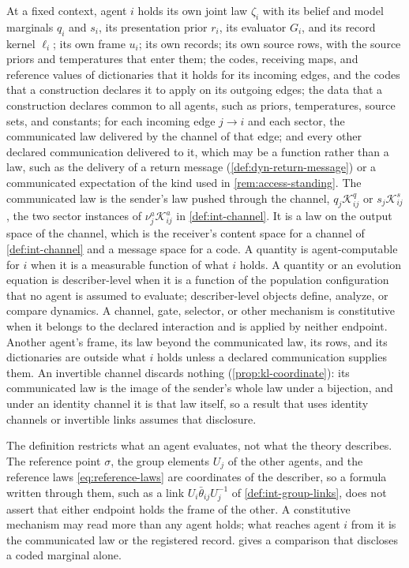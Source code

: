 At a fixed context, agent $i$ holds its own joint law $\zeta_i$ with its belief and model marginals $q_i$ and $s_i$, its presentation prior $r_i$, its evaluator $G_i$, and its record kernel $\ell_i$; its own frame $u_i$; its own records; its own source rows, with the source priors and temperatures that enter them; the codes, receiving maps, and reference values of dictionaries that it holds for its incoming edges, and the codes that a construction declares it to apply on its outgoing edges; the data that a construction declares common to all agents, such as priors, temperatures, source sets, and constants; for each incoming edge $j\to i$ and each sector, the communicated law delivered by the channel of that edge; and every other declared communication delivered to it, which may be a function rather than a law, such as the delivery of a return message (\cref{def:dyn-return-message}) or a communicated expectation of the kind used in \cref{rem:access-standing}. The communicated law is the sender's law pushed through the channel, $q_j\mathcal K^q_{ij}$ or $s_j\mathcal K^s_{ij}$, the two sector instances of $\nu_j^a\mathcal K_{ij}^a$ in \cref{def:int-channel}. It is a law on the output space of the channel, which is the receiver's content space for a channel of \cref{def:int-channel} and a message space for a code. A quantity is agent-computable for $i$ when it is a measurable function of what $i$ holds. A quantity or an evolution equation is describer-level when it is a function of the population configuration that no agent is assumed to evaluate; describer-level objects define, analyze, or compare dynamics. A channel, gate, selector, or other mechanism is constitutive when it belongs to the declared interaction and is applied by neither endpoint. Another agent's frame, its law beyond the communicated law, its rows, and its dictionaries are outside what $i$ holds unless a declared communication supplies them. An invertible channel discards nothing (\cref{prop:kl-coordinate}): its communicated law is the image of the sender's whole law under a bijection, and under an identity channel it is that law itself, so a result that uses identity channels or invertible links assumes that disclosure.

The definition restricts what an agent evaluates, not what the theory describes. The reference point $\sigma$, the group elements $U_j$ of the other agents, and the reference laws \cref{eq:reference-laws} are coordinates of the describer, so a formula written through them, such as a link $U_i\bar\theta_{ij}U_j^{-1}$ of \cref{def:int-group-links}, does not assert that either endpoint holds the frame of the other. A constitutive mechanism may read more than any agent holds; what reaches agent $i$ from it is the communicated law or the registered record.  gives a comparison that discloses a coded marginal alone.

